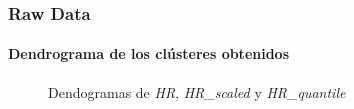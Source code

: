 \subsubsection{Raw Data}

\paragraph{Dendrograma de los clústeres obtenidos}

\begin{figure}[H]
    \centering
    
    \caption{Dendogramas de \textit{HR}, \textit{HR\_scaled} y \textit{HR\_quantile}}
    \label{fig:raw_data_den_fc}
\end{figure}

